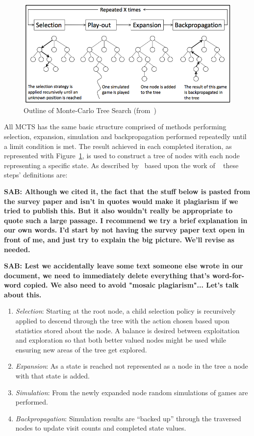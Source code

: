 \documentclass[letterpaper]{article}
\begin{document}
\begin{figure}[!t]
\begin{center}
\includegraphics[width=\textwidth]{images/outlinemcts.png}
\end{center}
\caption{Outline of Monte-Carlo Tree Search (from~\cite{winands2010monte}) }
\label{fig:OUTMCTS}
\end{figure}

All MCTS has the same basic structure comprised of methods performing selection, expansion, simulation and backpropagation performed repeatedly until a limit condition is met. The result achieved in each completed iteration, as represented with Figure~\ref{fig:OUTMCTS}, is used to construct a tree of nodes with each node representing a specific state. As described by~\cite{browne2012survey} based upon the work of ~\cite{chaslot2008monte} these steps' definitions are:

{\bf SAB: Although we cited it, the fact that the stuff below is pasted from the survey paper and isn't in quotes would make it plagiarism if we tried to publish this. But it also wouldn't really be appropriate to quote such a large passage. I recommend we try a brief explanation in our own words. I'd start by not having the survey paper text open in front of me, and just try to explain the big picture. We'll revise as needed.}

{\bf SAB: Lest we accidentally leave some text someone else wrote in our document, we need to immediately delete everything that's word-for-word copied. We also need to avoid "mosaic plagiarism"... Let's talk about this.}

\begin{enumerate}
\item \emph{Selection}: Starting at the root node, a child selection policy is recursively applied to descend through the tree with the action chosen based upon statistics stored about the node. A balance is desired between exploitation and exploration so that both better valued nodes might be used while ensuring new areas of the tree get explored.
\item \emph{Expansion}: As a state is reached not represented as a node in the tree a node with that state is added.
\item \emph{Simulation}: From the newly expanded node random simulations of games are performed.
\item \emph{Backpropagation}: Simulation results are ``backed up'' through the traversed nodes to update visit counts and completed state values.
\end{enumerate}
\end{document}
